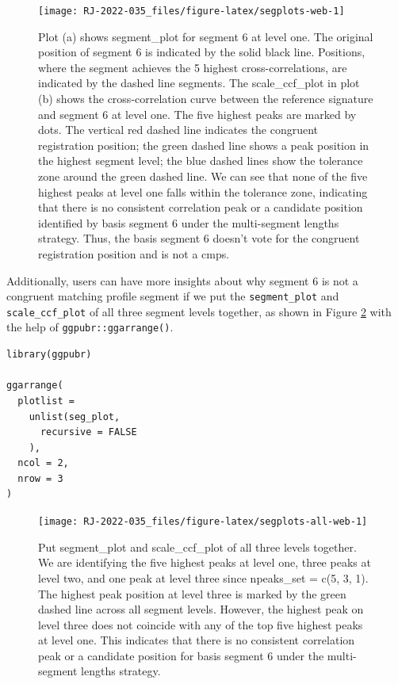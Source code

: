 \begin{figure}

{\centering \texttt{[image: RJ-2022-035\_files/figure-latex/segplots-web-1]} 

}

\caption{Plot (a) shows segment\_plot for segment 6 at level one. The original position of segment 6 is indicated by the solid black line. Positions, where the segment achieves the 5 highest cross-correlations, are indicated by the dashed line segments. The scale\_ccf\_plot in plot (b) shows the cross-correlation curve between the reference signature and segment 6 at level one. The five highest peaks are marked by dots. The vertical red dashed line indicates the congruent registration position; the green dashed line shows a peak position in the highest segment level; the blue dashed lines show the tolerance zone around the green dashed line. We can see that none of the five highest peaks at level one falls within the tolerance zone, indicating that there is no consistent correlation peak or a candidate position identified by basis segment 6 under the multi-segment lengths strategy. Thus, the basis segment 6 doesn't vote for the congruent registration position and is not a cmps.}\label{fig:segplots-web}
\end{figure}

Additionally, users can have more insights about why segment 6 is not a congruent matching profile segment if we put the \texttt{segment\_plot} and \texttt{scale\_ccf\_plot} of all three segment levels together, as shown in Figure \ref{fig:segplots-all-web} with the help of \texttt{ggpubr::ggarrange()}.

\begin{verbatim}
library(ggpubr)

ggarrange(
  plotlist =
    unlist(seg_plot,
      recursive = FALSE
    ),
  ncol = 2,
  nrow = 3
)
\end{verbatim}

\begin{figure}

{\centering \texttt{[image: RJ-2022-035\_files/figure-latex/segplots-all-web-1]} 

}

\caption{Put segment\_plot and scale\_ccf\_plot of all three levels together. We are identifying the five highest peaks at level one, three peaks at level two, and one peak at level three since npeaks\_set = c(5, 3, 1). The highest peak position at level three is marked by the green dashed line across all segment levels. However, the highest peak on level three does not coincide with any of the top five highest peaks at level one. This indicates that there is no consistent correlation peak or a candidate position for basis segment 6 under the multi-segment lengths strategy.}\label{fig:segplots-all-web}
\end{figure}

